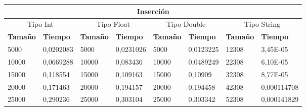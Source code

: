 \documentclass[11pt,openany]{book}
\begin{document}
\begin{table}[!ht]
    \centering
    \small
    \begin{tabular}{|l|l|l|l|l|l|l|l|}
        \hline
        \multicolumn{8}{|c|}{\cellcolor{blue!20}\textbf{Inserción}}                                                                                                                                                                                                                                \\ \hline
        \multicolumn{2}{|c|}{\cellcolor{gray!20}Tipo Int} & \multicolumn{2}{c|}{\cellcolor{gray!20}Tipo Float} & \multicolumn{2}{c|}{\cellcolor{gray!20}Tipo Double} & \multicolumn{2}{c|}{\cellcolor{gray!20}Tipo String}                                                                         \\ \hline
        \textbf{Tamaño}                                   & \textbf{Tiempo}                                    & \textbf{Tamaño}                                     & \textbf{Tiempo}                                     & \textbf{Tamaño} & \textbf{Tiempo} & \textbf{Tamaño} & \textbf{Tiempo} \\ \hline
        5000                                              & 0,0202083                                          & 5000                                                & 0,0231026                                           & 5000            & 0,0123225       & 12308           & 3,45E-05        \\ \hline
        10000                                             & 0,0669288                                          & 10000                                               & 0,083436                                            & 10000           & 0,0489249       & 22308           & 6,10E-05        \\ \hline
        15000                                             & 0,118554                                           & 15000                                               & 0,109163                                            & 15000           & 0,10909         & 32308           & 8,77E-05        \\ \hline
        20000                                             & 0,171463                                           & 20000                                               & 0,194157                                            & 20000           & 0,194458        & 42308           & 0,000114708     \\ \hline
        25000                                             & 0,290236                                           & 25000                                               & 0,303104                                            & 25000           & 0,303342        & 52308           & 0,000141829     \\ \hline

\end{tabular}
\end{table}
\end{document}
